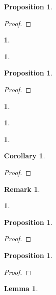 \documentclass{article}
\newtheorem{env}[term]{}
\newtheorem{remark}[term]{Remark}
\newtheorem{proposition}[term]{Proposition}
\newtheorem{cor}[term]{Corollary}
\newtheorem{lemma}[term]{Lemma}
\begin{document}
\begin{proposition}
\end{proposition}

\begin{proof}
\end{proof}

\begin{env}
\end{env}

\begin{env}
\end{env}

\begin{proposition}
\end{proposition}

\begin{proof}
\end{proof}

\begin{env}
\end{env}

\begin{env}
\end{env}

\begin{env}
\end{env}

\begin{cor}
\end{cor}

\begin{proof}
\end{proof}

\begin{remark}
\end{remark}

\begin{env}
\end{env}

\begin{proposition}
\end{proposition}

\begin{proof}
\end{proof}

\begin{proposition}
\end{proposition}

\begin{proof}
\end{proof}

\begin{lemma}
\end{lemma}
\end{document}
